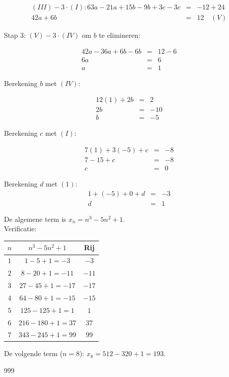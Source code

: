 \documentclass[a4paper]{article}
\begin{document}
\begin{eqnarray*}
(III) - 3 \cdot (I):63a - 21a + 15b - 9b + 3c - 3c &=& -12 + 24 \\
42a + 6b &=& 12 \quad (V)
\end{eqnarray*}

Stap 3: $(V) - 3 \cdot (IV)$ om $b$ te elimineren:

\begin{eqnarray*}
42a - 36a + 6b - 6b &=& 12 - 6 \\
6a &=& 6 \\
a &=& 1
\end{eqnarray*}

Berekening $b$ met $(IV)$:

\begin{eqnarray*}
12(1) + 2b &=& 2 \\
2b &=& -10 \\
b &=& -5
\end{eqnarray*}

Berekening $c$ met $(I)$:

\begin{eqnarray*}
7(1) + 3(-5) + c &=& -8 \\
7 - 15 + c &=& -8 \\
c &=& 0
\end{eqnarray*}

Berekening $d$ met $(1)$:\\

\begin{eqnarray*}
1 + (-5) + 0 + d &=& -3 \\
d &=& 1
\end{eqnarray*}

De algemene term is $x_n = n^3 - 5n^2 + 1$.\\

Verificatie:\\

\begin{tabular}{c|c|c}
$n$ & $n^3 - 5n^2 + 1$ & Rij \\ \hline
$1$ & $1 - 5 + 1 = -3$ & $-3$ \\
$2$ & $8 - 20 + 1 = -11$ & $-11$ \\
$3$ & $27 - 45 + 1 = -17$ & $-17$ \\
$4$ & $64 - 80 + 1 = -15$ & $-15$ \\
$5$ & $125 - 125 + 1 = 1$ & $1$ \\
$6$ & $216 - 180 + 1 = 37$ & $37$ \\
$7$ & $343 - 245 + 1 = 99$ & $99$
\end{tabular}

De volgende term ($n = 8$): $x_8 = 512 - 320 + 1 = 193$.

\begin{thebibliography}{999}
\end{thebibliography}
\end{document}
